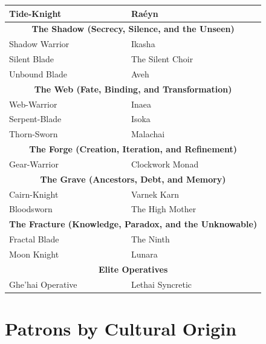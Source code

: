 \begin{longtable}{|p{4cm}|p{8cm}|p{4cm}|}
Tide-Knight & Raéyn & \pageref{sec:raeyn} \\
\hline
\multicolumn{3}{|c|}{\textbf{The Shadow (Secrecy, Silence, and the Unseen)}} \\
\hline
Shadow Warrior & Ikasha & \pageref{sec:ikasha} \\
Silent Blade & The Silent Choir & \pageref{sec:silent-choir} \\
Unbound Blade & Aveh & \pageref{sec:aveh} \\
\hline
\multicolumn{3}{|c|}{\textbf{The Web (Fate, Binding, and Transformation)}} \\
\hline
Web-Warrior & Inaea & \pageref{sec:inaea} \\
Serpent-Blade & Isoka & \pageref{sec:isoka} \\
Thorn-Sworn & Malachai & \pageref{sec:malachai} \\
\hline
\multicolumn{3}{|c|}{\textbf{The Forge (Creation, Iteration, and Refinement)}} \\
\hline
Gear-Warrior & Clockwork Monad & \pageref{sec:clockwork-monad} \\
\hline
\multicolumn{3}{|c|}{\textbf{The Grave (Ancestors, Debt, and Memory)}} \\
\hline
Cairn-Knight & Varnek Karn & \pageref{sec:varnek-karn} \\
Bloodsworn & The High Mother & \pageref{sec:high-mother} \\
\hline
\multicolumn{3}{|c|}{\textbf{The Fracture (Knowledge, Paradox, and the Unknowable)}} \\
\hline
Fractal Blade & The Ninth & \pageref{sec:ninth} \\
Moon Knight & Lunara & \pageref{sec:lunara} \\
\hline
\multicolumn{3}{|c|}{\textbf{Elite Operatives}} \\
\hline
Ghe'hai Operative & Lethai Syncretic & \pageref{sec:lethai-ghehai} \\
\hline
\end{longtable}

\section{Patrons by Cultural Origin}

